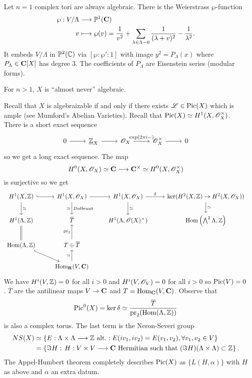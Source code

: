 \begin{example}
	Let $n=1$ complex tori are always algebraic. There is the Weierstrass $\wp$-function
	\begin{align*}
		\wp: V /\Lambda &\longrightarrow \P^{1}(\bb{C}) \\
		v &\longmapsto \wp(v) = \frac{1}{v^2} + \sum_{\lambda\in \Lambda-0}\frac{1}{(\lambda+v)^2}-\frac{1}{\lambda^2}
	.\end{align*}
	It embeds $V /\Lambda$ in $\P^2(\mathbb{C})$ via $[\wp:\wp':1]$ with image $y^2=P_\Lambda(x)$ where $P_\Lambda\in \bb{C}[X]$ has degree 3. The coefficients of $P_\Lambda$ are Eisenstein series (modular forms).

	For $n>1$, $X$ is ``almost never'' algebraic.
\end{example}
Recall that $X$ is algebraizable if and only if there exists $\CL\in \Pic(X)$ which is ample (see Mumford's Abelian Varieties). Recall that $\Pic(X)\isoto H^{1}(X,\OO_X^{\times})$. There is a short exact sequence
\begin{equation}
\begin{tikzcd}
	0 \ar[r] & \Zc_X \ar[r] & \OO_X \ar[r,"\exp(2\pi i-)"] & \OO_X^{\times} \ar[r] & 0
\end{tikzcd}
\end{equation}
so we get a long exact sequence. The map
\[
	H^{0}(X,\OO_X) \isoto \bb{C} \to \bb{C}^{\times}\isoto H^{0}(X,\OO_X^{\times})
\]
is surjective so we get
\begin{equation}
\begin{tikzcd}
	H^{1}(X,\Z) \ar[r,hook] \ar[d,"\isoto"] & H^{1}(X,\OO_X) \ar[d,"\isoto"',"Dolbeaut"] \ar[r] & H^{1}(X,\OO_X) \ar[d,"\isoto"] \ar[r,"\delta"] & \ker (H^2(X,\Z)\to H^2(X,\OO_X)) \ar[d,"\isoto"] \\
	H^{1}(\Lambda,\Z) \ar[d,equal] & \overline{T} & H^{1}(\Lambda,\OO(X)^{\times}) & \Hom\left( \bigwedge^2\Lambda,\Z \right)  \\
	\Hom(\Lambda,\Z) \ar[dr,hook] & T \oplus \overline{T} \ar[u,"\pr_2"] \\
				      & \Hom_{\bb{R}}(V,\bb{C}) \ar[u,"\isoto"]
\end{tikzcd}
\end{equation}
We have $H^{i}(V,\Z)=0$ for all $i>0$ and $H^{i}(V,\OO_V)=0$ for all $i>0$ so $\Pic(V)=0$. $\overline{T}$ are the antilinear maps $V\to \bb{C}$ and $T=\Hom_{\bb{C}}(V,\bb{C})$. Observe that
\[
\Pic^{0}(X) = \ker\delta \isoto \frac{\overline{T}}{\pr_2(\Hom(\Lambda,\Z))}
\]
is also a complex torus. The last term is the Neron-Severi group
\begin{align*}
	NS(X) &\isoto \{E:\Lambda\times \Lambda\to \Z\text{ alt.}: E(iv_1,iv_2)=E(v_1,v_2), \forall v_1,v_2\in V\} \\
	      &= \left\{ \Im H:\, H:V\times V\to \bb{C}\text{ Hermitian such that }(\Im H)(\Lambda\times \Lambda)\subset \Z \right\} 
.\end{align*}
The Appel-Humbert theorem completely describes $\Pic(X)$ as $\{L(H,\alpha)\} $ with $H$ as above and $\alpha$ an extra datum.

